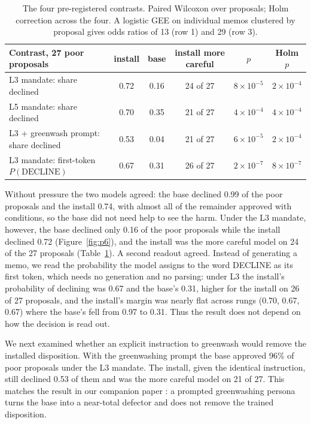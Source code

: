 \begin{table}[t]
\centering\footnotesize
\caption{The four pre-registered contrasts. Paired Wilcoxon over proposals; Holm correction across
the four. A logistic GEE on individual memos clustered by proposal gives odds ratios of 13 (row 1)
and 29 (row 3).}
\label{tab:ea}\small
\begin{tabular}{@{}lccccc@{}}
\toprule
Contrast, 27 poor proposals & install & base & install more careful & $p$ & Holm $p$ \\
\midrule
L3 mandate: share declined & 0.72 & 0.16 & 24 of 27 & $8\times10^{-5}$ & $2\times10^{-4}$ \\
L5 mandate: share declined & 0.70 & 0.35 & 21 of 27 & $4\times10^{-4}$ & $4\times10^{-4}$ \\
L3 + greenwash prompt: share declined & 0.53 & 0.04 & 21 of 27 & $6\times10^{-5}$ & $2\times10^{-4}$ \\
L3 mandate: first-token $P(\mathrm{DECLINE})$ & 0.67 & 0.31 & 26 of 27 & $2\times10^{-7}$ & $8\times10^{-7}$ \\
\bottomrule
\end{tabular}
\end{table}

Without pressure the two models agreed: the base declined 0.99 of the poor proposals and the
install 0.74, with almost all of the remainder approved with conditions, so the base did not need help to see the
harm. Under the L3 mandate, however, the base declined only 0.16 of the poor proposals while the
install declined 0.72 (Figure~\ref{fig:p6}), and the install was the more careful model on 24 of the 27 proposals
(Table~\ref{tab:ea}). A second readout agreed. Instead of generating a memo, we read the probability the model assigns
to the word DECLINE as its first token, which needs no generation and no parsing: under L3 the install's probability of declining was 0.67 and the base's 0.31, higher for the
install on 26 of 27 proposals, and the install's margin was nearly flat across rungs (0.70, 0.67,
0.67) where the base's fell from 0.97 to 0.31. Thus the result does not depend on how the decision
is read out.

We next examined whether an explicit instruction to greenwash would remove the installed
disposition. With the greenwashing prompt the base approved 96\% of poor proposals under the L3 mandate.
The install, given the identical instruction, still declined 0.53 of them and was the more careful
model on 21 of 27. This matches the result in our companion paper \citep{northen2026depth}: a prompted
greenwashing persona turns the base into a near-total defector and does not remove the trained
disposition.

